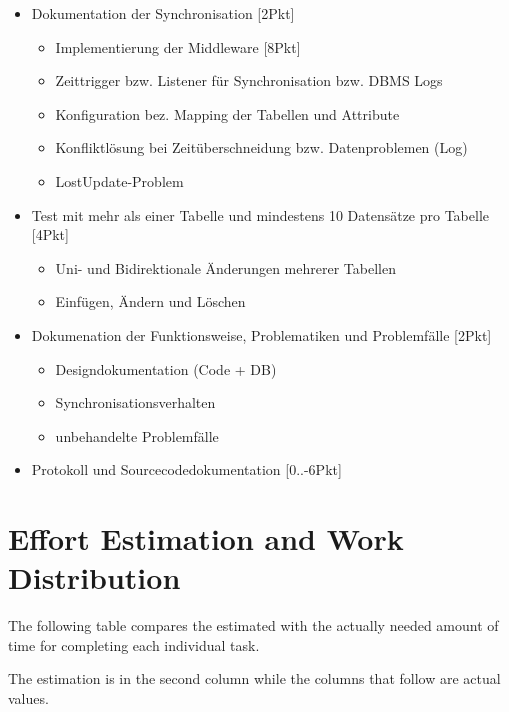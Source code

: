 \documentclass[11pt, a4paper]{article}
\begin{document}
\begin{itemize}

	\item Dokumentation der Synchronisation [2Pkt]
	
	\begin{itemize}
		\item Implementierung der Middleware [8Pkt]
		\item Zeittrigger bzw. Listener für Synchronisation bzw. DBMS Logs
		\item Konfiguration bez. Mapping der Tabellen und Attribute
		\item Konfliktlösung bei Zeitüberschneidung bzw. Datenproblemen (Log)
		\item LostUpdate-Problem
	\end{itemize}

	\item Test mit mehr als einer Tabelle und mindestens 10 Datensätze pro Tabelle [4Pkt]
	
	\begin{itemize}
		\item Uni- und Bidirektionale Änderungen mehrerer Tabellen
		\item Einfügen, Ändern und Löschen
	\end{itemize}	

	\item Dokumenation der Funktionsweise, Problematiken und Problemfälle [2Pkt]
	
	\begin{itemize}
		\item Designdokumentation (Code + DB)
		\item Synchronisationsverhalten
		\item unbehandelte Problemfälle
	\end{itemize}	

	\item Protokoll und Sourcecodedokumentation [0..-6Pkt]

\end{itemize}

\newpage

\section{Effort Estimation and Work Distribution}

The following table compares the estimated with the actually needed amount of time for completing each individual task.

The estimation is in the second column while the columns that follow are actual values.
\end{document}
